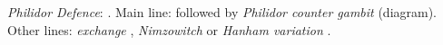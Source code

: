\emph{Philidor Defence}: .
Main line:  followed by \emph{Philidor counter gambit}  (diagram).
Other lines: \emph{exchange} , \emph{Nimzowitch}  or \emph{Hanham variation} .
